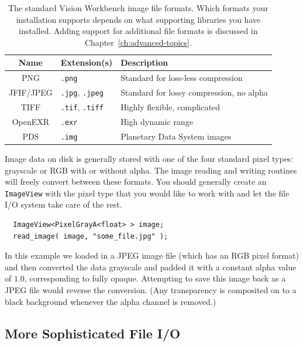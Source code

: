\begin{table}[t]\begin{centering}
\begin{tabular}{|c|l|l|} \hline
Name & Extension(s) & Description \\ \hline \hline
PNG & \verb#.png# & Standard for loss-less compression \\ \hline
JFIF/JPEG & \verb#.jpg#, \verb#.jpeg# & Standard for lossy compression, no alpha \\ \hline
TIFF & \verb#.tif#, \verb#.tiff# & Highly flexible, complicated \\ \hline
OpenEXR & \verb#.exr# & High dynamic range \\ \hline
PDS & \verb#.img# & Planetary Data System images \\ \hline
\end{tabular}
\caption{The standard Vision Workbench image file formats.  Which formats 
your installation supports depends on what supporting libraries you have 
installed.  Adding support for additional file formats is discussed in 
Chapter~\ref{ch:advanced-topics}.}
\label{tbl:file-formats}
\end{centering}\end{table}

Image data on disk is generally stored with one of the four standard
pixel types: grayscale or RGB with or without alpha.  The image
reading and writing routines will freely convert between these
formats.  You should generally create an \verb#ImageView# with the
pixel type that you would like to work with and let the file I/O
system take care of the rest.
\begin{verbatim}
  ImageView<PixelGrayA<float> > image;
  read_image( image, "some_file.jpg" );
\end{verbatim}
In this example we loaded in a JPEG image file (which has an RGB pixel
format) and then converted the data grayscale and padded it with a
constant alpha value of $1.0$, corresponding to fully opaque.  
Attempting to save this image back as a JPEG file would reverse the 
conversion.  (Any transparency is composited on to a black background 
whenever the alpha channel is removed.)

\subsection{More Sophisticated File I/O}

